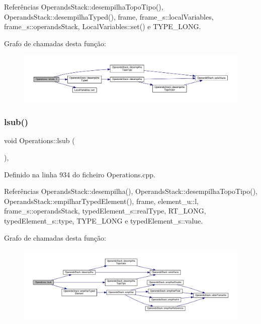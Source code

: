 Referências Operands\+Stack\+::desempilha\+Topo\+Tipo(), Operands\+Stack\+::desempilha\+Typed(), frame, frame\+\_\+s\+::local\+Variables, frame\+\_\+s\+::operands\+Stack, Local\+Variables\+::set() e T\+Y\+P\+E\+\_\+\+L\+O\+NG.

Grafo de chamadas desta função\+:
\nopagebreak
\begin{figure}[H]
\begin{center}
\leavevmode
\includegraphics[width=350pt]{classOperations_a00d5ca7ea5a68e9cccfdc26b11a716bf_cgraph}
\end{center}
\end{figure}
\mbox{\label{classOperations_a32485b21761b1e5540a6575822a2661a}} 
\subsubsection{\texorpdfstring{lsub()}{lsub()}}
{\footnotesize\ttfamily void Operations\+::lsub (\begin{DoxyParamCaption}{ }\end{DoxyParamCaption})\hspace{0.3cm}{\ttfamily [static]}, {\ttfamily [private]}}



Definido na linha 934 do ficheiro Operations.\+cpp.



Referências Operands\+Stack\+::desempilha(), Operands\+Stack\+::desempilha\+Topo\+Tipo(), Operands\+Stack\+::empilhar\+Typed\+Element(), frame, element\+\_\+u\+::l, frame\+\_\+s\+::operands\+Stack, typed\+Element\+\_\+s\+::real\+Type, R\+T\+\_\+\+L\+O\+NG, typed\+Element\+\_\+s\+::type, T\+Y\+P\+E\+\_\+\+L\+O\+NG e typed\+Element\+\_\+s\+::value.

Grafo de chamadas desta função\+:
\nopagebreak
\begin{figure}[H]
\begin{center}
\leavevmode
\includegraphics[width=350pt]{classOperations_a32485b21761b1e5540a6575822a2661a_cgraph}
\end{center}
\end{figure}
\mbox{\label{classOperations_a3b7c61f8bca7b3ad0dacae6649aee042}} 
